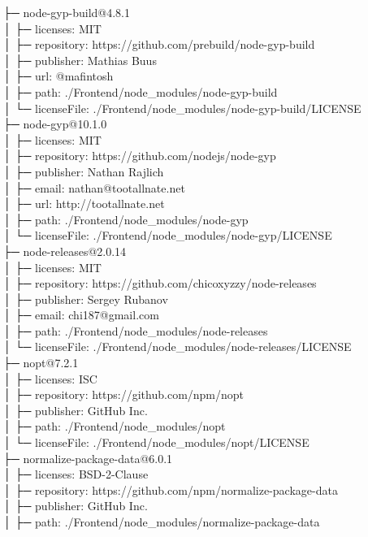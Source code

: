 ├─ node-gyp-build@4.8.1\\
│  ├─ licenses: MIT\\
│  ├─ repository: https://github.com/prebuild/node-gyp-build\\
│  ├─ publisher: Mathias Buus\\
│  ├─ url: @mafintosh\\
│  ├─ path: ./Frontend/node\_modules/node-gyp-build\\
│  └─ licenseFile: ./Frontend/node\_modules/node-gyp-build/LICENSE\\
├─ node-gyp@10.1.0\\
│  ├─ licenses: MIT\\
│  ├─ repository: https://github.com/nodejs/node-gyp\\
│  ├─ publisher: Nathan Rajlich\\
│  ├─ email: nathan@tootallnate.net\\
│  ├─ url: http://tootallnate.net\\
│  ├─ path: ./Frontend/node\_modules/node-gyp\\
│  └─ licenseFile: ./Frontend/node\_modules/node-gyp/LICENSE\\
├─ node-releases@2.0.14\\
│  ├─ licenses: MIT\\
│  ├─ repository: https://github.com/chicoxyzzy/node-releases\\
│  ├─ publisher: Sergey Rubanov\\
│  ├─ email: chi187@gmail.com\\
│  ├─ path: ./Frontend/node\_modules/node-releases\\
│  └─ licenseFile: ./Frontend/node\_modules/node-releases/LICENSE\\
├─ nopt@7.2.1\\
│  ├─ licenses: ISC\\
│  ├─ repository: https://github.com/npm/nopt\\
│  ├─ publisher: GitHub Inc.\\
│  ├─ path: ./Frontend/node\_modules/nopt\\
│  └─ licenseFile: ./Frontend/node\_modules/nopt/LICENSE\\
├─ normalize-package-data@6.0.1\\
│  ├─ licenses: BSD-2-Clause\\
│  ├─ repository: https://github.com/npm/normalize-package-data\\
│  ├─ publisher: GitHub Inc.\\
│  ├─ path: ./Frontend/node\_modules/normalize-package-data\\
